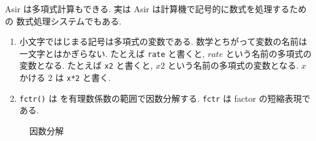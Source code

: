 \documentclass{jbook}
\begin{document}
\bigbreak
%
%
\noindent
\HHH   {} 
Asir は多項式計算もできる. 実は Asir は計算機で記号的に数式を処理するための
数式処理システムでもある.
\begin{enumerate}
\item 小文字ではじまる記号は多項式の変数である.
数学とちがって変数の名前は一文字とはかぎらない.
たとえば {\tt rate} と書くと,  $rate$ という名前の多項式の変数となる.
たとえば {\tt x2} と書くと,  $x2$ という名前の多項式の変数となる.
$x$ かける $2$ は {\tt x*2} と書く.  
%
%
\item   {}  
{\tt fctr(\poly)} は \poly を有理数係数の範囲で因数分解する.
{\tt fctr} は factor の短縮表現である. 
%
% 
\end{enumerate}

\begin{figure}[tbh]
\begin{center}
\end{center}
\caption{因数分解} \label{fig:fctr1}
\end{figure}
\end{document}
